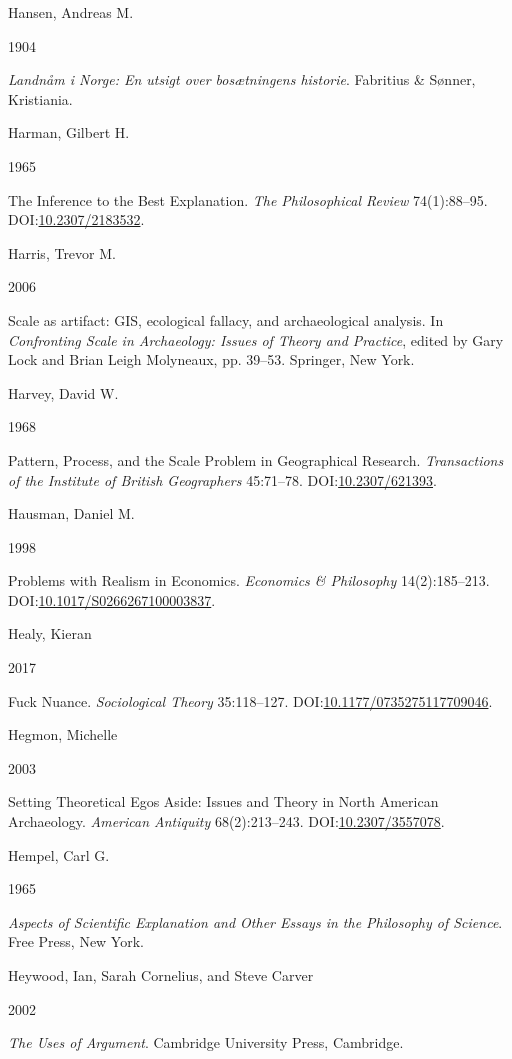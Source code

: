 \documentclass[
  a4paper,
  oneside]{uiophdthesis}
\newlength{\cslhangindent}
\newlength{\csllabelwidth}
\newlength{\cslentryspacingunit} %
\newenvironment{CSLReferences}[2] %
 {%
  \setlength{\parindent}{0pt}
  \ifodd #1
  \let\oldpar\par
  \def\par{\hangindent=\cslhangindent\oldpar}
  \fi
  \setlength{\parskip}{#2\cslentryspacingunit}
 }%
 {}
\newcommand{\CSLBlock}[1]{#1\hfill\break}
\newcommand{\CSLLeftMargin}[1]{\parbox[t]{\csllabelwidth}{#1}}
\newcommand{\CSLRightInline}[1]{\parbox[t]{\linewidth - \csllabelwidth}{#1}\break}
\begin{document}
\begin{CSLReferences}{0}{0}
\leavevmode{}%
\CSLBlock{Hansen, Andreas M.}
\CSLLeftMargin{ 1904}
\CSLRightInline{\emph{{Landnåm i Norge: En utsigt over bosætningens historie}}. Fabritius \& Sønner, Kristiania.}

\leavevmode{}%
\CSLBlock{Harman, Gilbert H.}
\CSLLeftMargin{ 1965}
\CSLRightInline{{The Inference to the Best Explanation}. \emph{The Philosophical Review} 74(1):88--95. DOI:\href{https://doi.org/10.2307/2183532}{10.2307/2183532}.}

\leavevmode{}%
\CSLBlock{Harris, Trevor M.}
\CSLLeftMargin{ 2006}
\CSLRightInline{Scale as artifact: GIS, ecological fallacy, and archaeological analysis. In \emph{{Confronting Scale in Archaeology: Issues of Theory and Practice}}, edited by Gary Lock and Brian Leigh Molyneaux, pp. 39--53. Springer, New York.}

\leavevmode{}%
\CSLBlock{Harvey, David W.}
\CSLLeftMargin{ 1968}
\CSLRightInline{{Pattern, Process, and the Scale Problem in Geographical Research}. \emph{Transactions of the Institute of British Geographers} 45:71--78. DOI:\href{https://doi.org/10.2307/621393}{10.2307/621393}.}

\leavevmode{}%
\CSLBlock{Hausman, Daniel M.}
\CSLLeftMargin{ 1998}
\CSLRightInline{{Problems with Realism in Economics}. \emph{Economics \& Philosophy} 14(2):185--213. DOI:\href{https://doi.org/10.1017/S0266267100003837}{10.1017/S0266267100003837}.}

\leavevmode{}%
\CSLBlock{Healy, Kieran}
\CSLLeftMargin{ 2017}
\CSLRightInline{Fuck Nuance. \emph{Sociological Theory} 35:118--127. DOI:\href{https://doi.org/10.1177/0735275117709046}{10.1177/0735275117709046}.}

\leavevmode{}%
\CSLBlock{Hegmon, Michelle}
\CSLLeftMargin{ 2003}
\CSLRightInline{{Setting Theoretical Egos Aside: Issues and Theory in North American Archaeology}. \emph{American Antiquity} 68(2):213--243. DOI:\href{https://doi.org/10.2307/3557078}{10.2307/3557078}.}

\leavevmode{}%
\CSLBlock{Hempel, Carl G.}
\CSLLeftMargin{ 1965}
\CSLRightInline{\emph{{Aspects of Scientific Explanation and Other Essays in the Philosophy of Science}}. Free Press, New York.}

\leavevmode{}%
\CSLBlock{Heywood, Ian, Sarah Cornelius, and Steve Carver}
\CSLLeftMargin{ 2002}
\CSLRightInline{\emph{{The Uses of Argument}}. Cambridge University Press, Cambridge.}


\end{CSLReferences}
\end{document}
